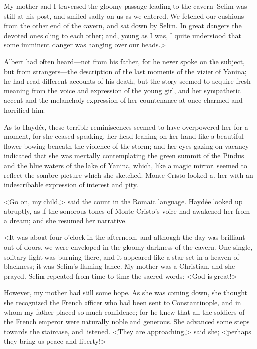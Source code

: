 My mother and I traversed the gloomy passage leading to the cavern. Selim was still at his post, and smiled sadly on us as we entered. We fetched our cushions from the other end of the cavern, and sat down by Selim. In great dangers the devoted ones cling to each other; and, young as I was, I quite understood that some imminent danger was hanging over our heads.> 

 Albert had often heard—not from his father, for he never spoke on the subject, but from strangers—the description of the last moments of the vizier of Yanina; he had read different accounts of his death, but the story seemed to acquire fresh meaning from the voice and expression of the young girl, and her sympathetic accent and the melancholy expression of her countenance at once charmed and horrified him. 

 As to Haydée, these terrible reminiscences seemed to have overpowered her for a moment, for she ceased speaking, her head leaning on her hand like a beautiful flower bowing beneath the violence of the storm; and her eyes gazing on vacancy indicated that she was mentally contemplating the green summit of the Pindus and the blue waters of the lake of Yanina, which, like a magic mirror, seemed to reflect the sombre picture which she sketched. Monte Cristo looked at her with an indescribable expression of interest and pity. 

 <Go on, my child,> said the count in the Romaic language.  Haydée looked up abruptly, as if the sonorous tones of Monte Cristo's voice had awakened her from a dream; and she resumed her narrative. 

<It was about four o'clock in the afternoon, and although the day was brilliant out-of-doors, we were enveloped in the gloomy darkness of the cavern. One single, solitary light was burning there, and it appeared like a star set in a heaven of blackness; it was Selim's flaming lance. My mother was a Christian, and she prayed. Selim repeated from time to time the sacred words: <God is great!> 

However, my mother had still some hope. As she was coming down, she thought she recognized the French officer who had been sent to Constantinople, and in whom my father placed so much confidence; for he knew that all the soldiers of the French emperor were naturally noble and generous. She advanced some steps towards the staircase, and listened. <They are approaching,> said she; <perhaps they bring us peace and liberty!> 

